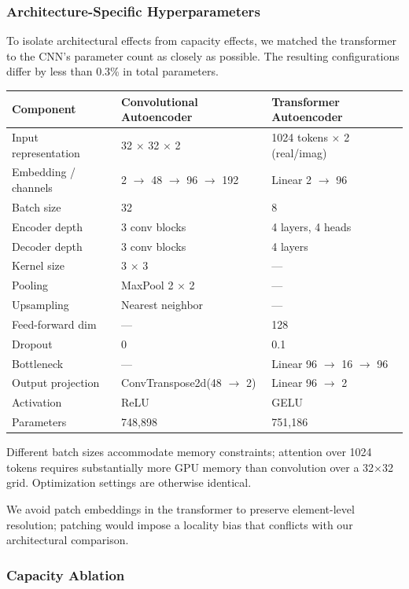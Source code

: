 \documentclass[a4paper, 11pt, colorlinks=true, citecolor=., linkcolor=black, urlcolor=black]{article}
\begin{document}
\subsubsection{Architecture-Specific Hyperparameters}
\label{sec:org03e934a}

To isolate architectural effects from capacity effects, we matched the transformer to the CNN's parameter count as closely as possible. The resulting configurations differ by less than 0.3\% in total parameters.

\begin{center}
\begin{tabular}{lll}
Component & Convolutional Autoencoder & Transformer Autoencoder\\
\hline
Input representation & 32 \(\times\) 32 \(\times\) 2 & 1024 tokens \(\times\) 2 (real/imag)\\
Embedding / channels & 2 \(\rightarrow\) 48 \(\rightarrow\) 96 \(\rightarrow\) 192 & Linear 2 \(\rightarrow\) 96\\
Batch size & 32 & 8\\
Encoder depth & 3 conv blocks & 4 layers, 4 heads\\
Decoder depth & 3 conv blocks & 4 layers\\
Kernel size & 3 \(\times\) 3 & —\\
Pooling & MaxPool 2 \(\times\) 2 & —\\
Upsampling & Nearest neighbor & —\\
Feed-forward dim & — & 128\\
Dropout & 0 & 0.1\\
Bottleneck & — & Linear 96 \(\rightarrow\) 16 \(\rightarrow\) 96\\
Output projection & ConvTranspose2d(48 \(\rightarrow\) 2) & Linear 96 \(\rightarrow\) 2\\
Activation & ReLU & GELU\\
Parameters & 748,898 & 751,186\\
\end{tabular}
\end{center}

Different batch sizes accommodate memory constraints; attention over 1024 tokens requires substantially more GPU memory than convolution over a 32×32 grid. Optimization settings are otherwise identical.

We avoid patch embeddings in the transformer to preserve element-level resolution; patching would impose a locality bias that conflicts with our architectural comparison.
\subsubsection{Capacity Ablation}
\label{sec:orgb39347d}
\end{document}
